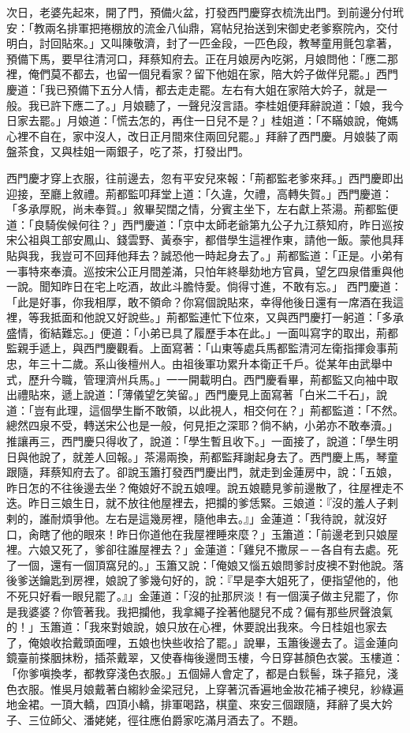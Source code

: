 次日，老婆先起來，開了門，預備火盆，打發西門慶穿衣梳洗出門。到前邊分付玳安：「教兩名排軍把捲棚放的流金八仙鼎，寫帖兒抬送到宋御史老爹察院內，交付明白，討回貼來。」又叫陳敬濟，封了一匹金段，一匹色段，教琴童用氈包拿著，預備下馬，要早往清河口，拜蔡知府去。正在月娘房內吃粥，月娘問他：「應二那裡，俺們莫不都去，也留一個兒看家？留下他姐在家，陪大妗子做伴兒罷。」西門慶道：「我已預備下五分人情，都去走走罷。左右有大姐在家陪大妗子，就是一般。我已許下應二了。」月娘聽了，一聲兒沒言語。李桂姐便拜辭說道：「娘，我今日家去罷。」月娘道：「慌去怎的，再住一日兒不是？」桂姐道：「不瞞娘說，俺媽心裡不自在，家中沒人，改日正月間來住兩回兒罷。」拜辭了西門慶。月娘裝了兩盤茶食，又與桂姐一兩銀子，吃了茶，打發出門。

西門慶才穿上衣服，往前邊去，忽有平安兒來報：「荊都監老爹來拜。」西門慶即出迎接，至廳上敘禮。荊都監叩拜堂上道：「久違，欠禮，高轉失賀。」西門慶道：「多承厚貺，尚未奉賀。」敘畢契闊之情，分賓主坐下，左右獻上茶湯。荊都監便道：「良騎俟候何往？」西門慶道：「京中太師老爺第九公子九江蔡知府，昨日巡按宋公祖與工部安鳳山、錢雲野、黃泰宇，都借學生這裡作東，請他一飯。蒙他具拜貼與我，我豈可不回拜他拜去？誠恐他一時起身去了。」荊都監道：「正是。小弟有一事特來奉瀆。巡按宋公正月間差滿，只怕年終舉劾地方官員，望乞四泉借重與他一說。聞知昨日在宅上吃酒，故此斗膽恃愛。倘得寸進，不敢有忘。」 西門慶道：「此是好事，你我相厚，敢不領命？你寫個說貼來，幸得他後日還有一席酒在我這裡，等我抵面和他說又好說些。」荊都監連忙下位來，又與西門慶打一躬道：「多承盛情，銜結難忘。」便道：「小弟已具了履歷手本在此。」一面叫寫字的取出，荊都監親手遞上，與西門慶觀看。上面寫著：「山東等處兵馬都監清河左衛指揮僉事荊忠，年三十二歲。系山後檀州人。由祖後軍功累升本衛正千戶。從某年由武舉中式，歷升今職，管理濟州兵馬。」一一開載明白。西門慶看畢，荊都監又向袖中取出禮貼來，遞上說道：「薄儀望乞笑留。」西門慶見上面寫著「白米二千石」，說道：「豈有此理，這個學生斷不敢領，以此視人，相交何在？」荊都監道：「不然。總然四泉不受，轉送宋公也是一般，何見拒之深耶？倘不納，小弟亦不敢奉瀆。」推讓再三，西門慶只得收了，說道：「學生暫且收下。」一面接了，說道：「學生明日與他說了，就差人回報。」茶湯兩換，荊都監拜謝起身去了。西門慶上馬，琴童跟隨，拜蔡知府去了。卻說玉簫打發西門慶出門，就走到金蓮房中，說：「五娘，昨日怎的不往後邊去坐？俺娘好不說五娘哩。說五娘聽見爹前邊散了，往屋裡走不迭。昨日三娘生日，就不放往他屋裡去，把攔的爹恁緊。三娘道：『沒的羞人子剌剌的，誰耐煩爭他。左右是這幾房裡，隨他串去。』」金蓮道：「我待說，就沒好口，肏瞎了他的眼來！昨日你道他在我屋裡睡來麼？」玉簫道：「前邊老到只娘屋裡。六娘又死了，爹卻往誰屋裡去？」金蓮道：「雞兒不撒尿－－各自有去處。死了一個，還有一個頂窩兒的。」玉簫又說：「俺娘又惱五娘問爹討皮襖不對他說。落後爹送鑰匙到房裡，娘說了爹幾句好的，說：『早是李大姐死了，便指望他的，他不死只好看一眼兒罷了。』」金蓮道：「沒的扯那屄淡！有一個漢子做主兒罷了，你是我婆婆？你管著我。我把攔他，我拿繩子拴著他腿兒不成？偏有那些屄聲浪氣的！」玉簫道：「我來對娘說，娘只放在心裡，休要說出我來。今日桂姐也家去了，俺娘收拾戴頭面哩，五娘也快些收拾了罷。」說畢，玉簫後邊去了。這金蓮向鏡臺前搽胭抹粉，插茶戴翠，又使春梅後邊問玉樓，今日穿甚顏色衣裳。玉樓道：「你爹嗔換孝，都教穿淺色衣服。」五個婦人會定了，都是白䯼髻，珠子箍兒，淺色衣服。惟吳月娘戴著白縐紗金梁冠兒，上穿著沉香遍地金妝花補子襖兒，紗綠遍地金裙。一頂大轎，四頂小轎，排軍喝路，棋童、來安三個跟隨，拜辭了吳大妗子、三位師父、潘姥姥，徑往應伯爵家吃滿月酒去了。不題。

